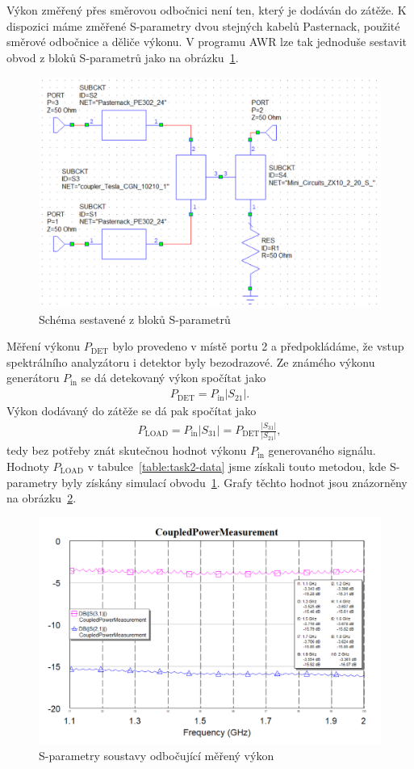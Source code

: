 \documentclass[11pt,a4paper]{article}
\begin{document}
Výkon změřený přes směrovou odbočnici není ten, který je dodáván do zátěže. K dispozici máme změřené S-parametry dvou stejných kabelů Pasternack, použité směrové odbočnice a děliče výkonu. V programu AWR lze tak jednoduše sestavit obvod z bloků S-parametrů jako na obrázku~\ref{fig:task2-sparametry}.
\begin{figure}[!ht]
    \centering
    \includegraphics[width=.8\textwidth]{src/task2-sparametry.png}
    \caption{\label{fig:task2-sparametry}Schéma sestavené z bloků S-parametrů}
\end{figure}
Měření výkonu $P_{\mathrm{DET}}$ bylo provedeno v místě portu 2 a předpokládáme, že vstup spektrálního analyzátoru i detektor byly bezodrazové. Ze známého výkonu generátoru $P_{\mathrm{in}}$ se dá detekovaný výkon spočítat jako
\begin{align}
    P_{\mathrm{DET}} = P_{\mathrm{in}} \left|S_{21}\right|.
\end{align}
Výkon dodávaný do zátěže se dá pak spočítat jako
\begin{align}
    P_{\mathrm{LOAD}} = P_{\mathrm{in}} \left|S_{31}\right| = P_{\mathrm{DET}} \frac{\left|S_{31}\right|}{\left|S_{21}\right|},
\end{align}
tedy bez potřeby znát skutečnou hodnot výkonu $P_{\mathrm{in}}$ generovaného signálu. Hodnoty $P_{\mathrm{LOAD}}$ v tabulce~\ref{table:task2-data} jsme získali touto metodou, kde S-parametry byly získány simulací obvodu~\ref{fig:task2-sparametry}. Grafy těchto hodnot jsou znázorněny na obrázku~\ref{fig:task2-sparameter-data}.
\begin{figure}[!ht]
    \centering
    \includegraphics[width=.8\textwidth]{src/task2-sparameter_data.png}
    \caption{\label{fig:task2-sparameter-data}S-parametry soustavy odbočující měřený výkon}
\end{figure}
\end{document}
